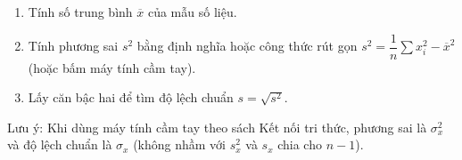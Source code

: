 \begin{enumerate}
\item Tính số trung bình $\overline{x}$ của mẫu số liệu.
\item Tính phương sai $s^2$ bằng định nghĩa hoặc công thức rút gọn $s^2 = \dfrac{1}{n}\sum x_i^2 - \overline{x}^2$ (hoặc bấm máy tính cầm tay).
\item Lấy căn bậc hai để tìm độ lệch chuẩn $s = \sqrt{s^2}$.
\end{enumerate}
Lưu ý: Khi dùng máy tính cầm tay theo sách Kết nối tri thức, phương sai là $\sigma_x^2$ và độ lệch chuẩn là $\sigma_x$ (không nhầm với $s_x^2$ và $s_x$ chia cho $n-1$).
